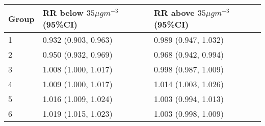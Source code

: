 \begin{tabular}{lll}
  \hline
Group & RR below $35 \mu g m^{-3}$ (95\%CI) & RR above $35 \mu g m^{-3}$ (95\%CI) \\ 
  \hline
   1 & 0.932 (0.903, 0.963) & 0.989 (0.947, 1.032) \\ 
     2 & 0.950 (0.932, 0.969) & 0.968 (0.942, 0.994) \\ 
     3 & 1.008 (1.000, 1.017) & 0.998 (0.987, 1.009) \\ 
     4 & 1.009 (1.000, 1.017) & 1.014 (1.003, 1.026) \\ 
     5 & 1.016 (1.009, 1.024) & 1.003 (0.994, 1.013) \\ 
     6 & 1.019 (1.015, 1.023) & 1.003 (0.998, 1.009) \\ 
   \hline
\end{tabular}

